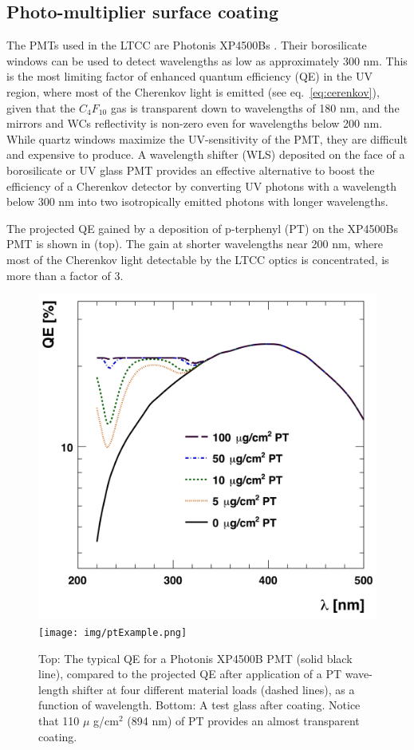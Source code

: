 \subsection{Photo-multiplier surface coating}

The PMTs used in the LTCC are Photonis XP4500Bs \cite{Photonis:2007ta}.
Their borosilicate windows can be used to detect wavelengths as low as approximately
300 nm. This is the most limiting factor of enhanced quantum efficiency (QE) in the UV region, where most of the Cherenkov
light is emitted (see eq.~\ref{eq:cerenkov}), given that the $C_4F_{10}$ gas is transparent down to
wavelengths of 180 nm, and the mirrors and WCs reflectivity is non-zero
even for wavelengths below 200 nm.
While quartz windows maximize the UV-sensitivity of the PMT, they are difficult and expensive to produce.
A wavelength shifter (WLS) deposited on the face of a borosilicate or UV glass
PMT provides an effective alternative to boost the efficiency of a Cherenkov
detector by converting UV photons with a wavelength below 300 nm into two
isotropically emitted photons with longer wavelengths.

The projected QE gained by a deposition of p-terphenyl (PT) on the XP4500Bs
PMT \cite{Koczon:1457653} is shown in  (top).
The gain at shorter wavelengths near 200 nm, where most of the Cherenkov light
detectable by the LTCC optics is concentrated, is more than a factor of 3.


\begin{figure}
	\centering
	\includegraphics[width=0.99\columnwidth, height=0.65\columnwidth]{img/pmtQuantumEfficiencyGain.png}
	\texttt{[image: img/ptExample.png]}
	\caption{Top: The typical QE for a Photonis XP4500B PMT (solid black line), compared to the projected QE after application
				of a PT wave-length shifter at four different material loads (dashed lines), as a function of wavelength.
            Bottom: A test glass after coating. Notice that  110 $\mu$ g/cm$^2$ (894 nm) of PT provides an
            almost transparent coating.}
	\label{fig:pmtQuantumEfficiencyGainAndExample}
\end{figure}

